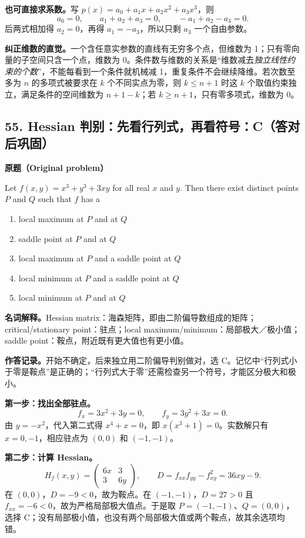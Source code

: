 \documentclass[11pt,a4paper,fontset=fandol]{ctexart}
\begin{document}
\textbf{也可直接求系数。}写 $p(x)=a_0+a_1x+a_2x^2+a_3x^3$，则
\[
a_0=0,\qquad a_1+a_2+a_3=0,\qquad -a_1+a_2-a_3=0.
\]
后两式相加得 $a_2=0$，再得 $a_1=-a_3$，所以只剩 $a_3$ 一个自由参数。

\textbf{纠正维数的直觉。}一个含任意实参数的直线有无穷多个点，但维数为 1；只有零向量的子空间只含一个点，维数为 0。条件数与维数的关系是“维数减去\emph{独立线性约束的个数}”，不能每看到一个条件就机械减 1，重复条件不会继续降维。若次数至多为 $n$ 的多项式被要求在 $k$ 个不同实点为零，则 $k\le n+1$ 时这 $k$ 个取值约束独立，满足条件的空间维数为 $n+1-k$；若 $k\ge n+1$，只有零多项式，维数为 0。

\subsection{55. Hessian 判别：先看行列式，再看符号：C（答对后巩固）}
\label{p4:q55}
\textbf{原题（Original problem）}

Let $f(x,y)=x^3+y^3+3xy$ for all real $x$ and $y$. Then there exist distinct points $P$ and $Q$ such that $f$ has a
\begin{enumerate}[label=(\Alph*)]
\item local maximum at $P$ and at $Q$
\item saddle point at $P$ and at $Q$
\item local maximum at $P$ and a saddle point at $Q$
\item local minimum at $P$ and a saddle point at $Q$
\item local minimum at $P$ and at $Q$
\end{enumerate}
\textbf{名词解释。}Hessian matrix：海森矩阵，即由二阶偏导数组成的矩阵；critical/stationary point：驻点；local maximum/minimum：局部极大／极小值；saddle point：鞍点，附近既有更大值也有更小值。

\textbf{作答记录。}开始不确定，后来独立用二阶偏导判别做对，选 C。记忆中“行列式小于零是鞍点”是正确的；“行列式大于零”还需检查另一个符号，才能区分极大和极小。

\textbf{第一步：找出全部驻点。}
\[
f_x=3x^2+3y=0,\qquad f_y=3y^2+3x=0.
\]
由 $y=-x^2$，代入第二式得 $x^4+x=0$，即 $x(x^3+1)=0$。实数解只有 $x=0,-1$，相应驻点为 $(0,0)$ 和 $(-1,-1)$。

\textbf{第二步：计算 Hessian。}
\[
H_f(x,y)=\begin{pmatrix}6x&3\\3&6y\end{pmatrix},
\qquad D=f_{xx}f_{yy}-f_{xy}^2=36xy-9.
\]
在 $(0,0)$，$D=-9<0$，故为鞍点。在 $(-1,-1)$，$D=27>0$ 且 $f_{xx}=-6<0$，故为严格局部极大值点。于是取 $P=(-1,-1)$、$Q=(0,0)$，选择 C；没有局部极小值，也没有两个局部极大值或两个鞍点，故其余选项均错。
\end{document}
